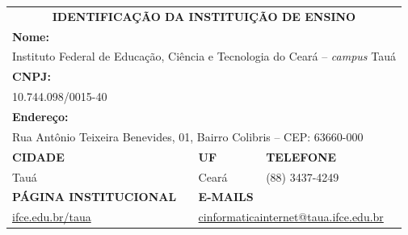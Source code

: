 \documentclass[
	12pt,				%
	openright,			%
	twoside,			%
	a4paper,			%
	chapter=TITLE,		%
	english,			%
	french,				%
	spanish,			%
	brazil,				%
	]{abntex2}
\begin{document}
\small
\noindent
\begin{tabularx}{\linewidth}{X X X X }
    
    \multicolumn{4}{c}{\cellcolor{gray!40}\textbf{IDENTIFICAÇÃO DA INSTITUIÇÃO DE ENSINO}} \\

    \multicolumn{4}{l}{\cellcolor{gray!20}\textbf{Nome:}} \\
    \multicolumn{4}{l}{Instituto Federal de Educação, Ciência e Tecnologia do Ceará -- \textit{campus} Tauá} \\
    
    \multicolumn{4}{l}{\cellcolor{gray!20}\textbf{CNPJ:}} \\
    \multicolumn{4}{l}{10.744.098/0015-40} \\
    
    \multicolumn{4}{l}{\cellcolor{gray!20}\textbf{Endere\c{c}o:}} \\
    \multicolumn{4}{l}{Rua Antônio Teixeira Benevides, 01, Bairro Colibris -- CEP: 63660-000} \\
    
    
     
    \multicolumn{2}{l}{\cellcolor{gray!20}\textbf{CIDADE}} & \cellcolor{gray!20} \textbf{UF} & \cellcolor{gray!20} \textbf{TELEFONE} \\
     
    \multicolumn{2}{l}{Tauá} & Ceará & (88) 3437-4249\\

     \multicolumn{2}{l}{\cellcolor{gray!20}\textbf{PÁGINA INSTITUCIONAL}} &
     \multicolumn{2}{l}{\cellcolor{gray!20}\textbf{E-MAILS}} \\
     
     \multicolumn{2}{l}{\href{http://ifce.edu.br/taua}{ifce.edu.br/taua}} &
     \multicolumn{2}{l}{\href{mailto:cinformaticainternet@taua.ifce.edu.br}{cinformaticainternet@taua.ifce.edu.br}} \\
     
     
\end{tabularx}
\end{document}
